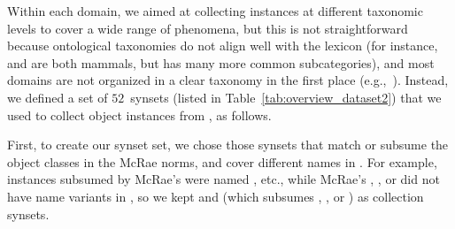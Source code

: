 Within each domain, we aimed at collecting instances at different taxonomic levels to cover a wide range of phenomena, but this is not straightforward because ontological taxonomies do not align well with the lexicon (for instance,  and  are both mammals, but  has many more common subcategories), and most domains are not organized in a clear taxonomy in the first place (e.g.,~).
Instead, we defined a set of $52$~synsets (listed in Table~\ref{tab:overview_dataset2}) that we used to collect object instances from \vg, as follows. 

First, to create our synset set, we chose those \vg synsets that match or subsume the object classes in the McRae norms, and cover different names in \vg.
For example, \vg instances subsumed by McRae's  were named , etc., while McRae's , , or  did not have name variants in \vg, so we kept  and  (which subsumes , , or ) as collection synsets.

